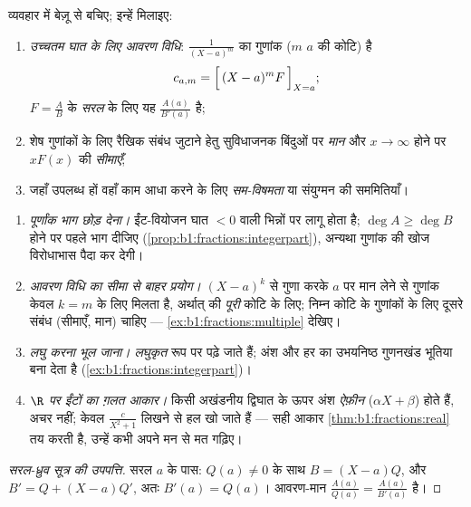 \begin{method}[गुणांकों की संगणना]\label{met:b1:fractions:compute}
व्यवहार में बेज़ू से बचिए; इन्हें मिलाइए:
\begin{enumerate}
  \item \emph{उच्चतम घात के लिए आवरण विधि}: $\frac{1}{(X-a)^m}$ का गुणांक
  ($m$  $a$ की कोटि) है
        \[
        c_{a,m} = \Bigl[\,(X - a)^m F\,\Bigr]_{X = a};
        \]
        $F = \frac AB$ के \emph{सरल}  के लिए यह $\frac{A(a)}{B'(a)}$
        है;
  \item शेष गुणांकों के लिए रैखिक संबंध जुटाने हेतु सुविधाजनक बिंदुओं पर
  \emph{मान} और $x \to \infty$ होने पर $xF(x)$ की \emph{सीमाएँ};
  \item जहाँ उपलब्ध हों वहाँ काम आधा करने के लिए \emph{सम-विषमता} या
  संयुग्मन की सममितियाँ।
\end{enumerate}
\end{method}

\begin{remark}[आंशिक भिन्नों की सामान्य भूलें]\label{rem:b1:fractions:pitfalls}
\begin{enumerate}
  \item \emph{पूर्णांक भाग छोड़ देना।} ईंट-वियोजन घात $< 0$ वाली भिन्नों पर
  लागू होता है; $\deg A \geq \deg B$ होने पर पहले भाग दीजिए
  (\cref{prop:b1:fractions:integerpart}), अन्यथा गुणांक की खोज विरोधाभास
  पैदा कर देगी।
  \item \emph{आवरण विधि का सीमा से बाहर प्रयोग।} $(X - a)^k$ से गुणा करके
  $a$ पर मान लेने से गुणांक केवल $k = m$ के लिए मिलता है, अर्थात्  की
  \emph{पूरी} कोटि के लिए; निम्न कोटि के गुणांकों के लिए दूसरे संबंध
  (सीमाएँ, मान) चाहिए --- \cref{ex:b1:fractions:multiple} देखिए।
  \item \emph{लघु करना भूल जाना।}  \emph{लघुकृत} रूप पर पढ़े जाते हैं;
  अंश और हर का उभयनिष्ठ गुणनखंड भूतिया  बना देता है
  (\cref{ex:b1:fractions:integerpart})।
  \item \emph{$\R$ पर ईंटों का ग़लत आकार।} किसी अखंडनीय द्विघात के ऊपर अंश
  \emph{ऐफ़ीन} ($\alpha X + \beta$) होते हैं, अचर नहीं; केवल $\frac{c}{X^2 +
  1}$ लिखने से हल खो जाते हैं --- सही आकार \cref{thm:b1:fractions:real} तय
  करती है, उन्हें कभी अपने मन से मत गढ़िए।
\end{enumerate}
\end{remark}

\begin{proof}[सरल-ध्रुव सूत्र की उपपत्ति]
सरल  $a$ के पास: $Q(a) \neq 0$ के साथ $B = (X - a) Q$, और $B' = Q + (X
- a) Q'$, अतः $B'(a) = Q(a)$। आवरण-मान $\frac{A(a)}{Q(a)} =
\frac{A(a)}{B'(a)}$ है।
\end{proof}

